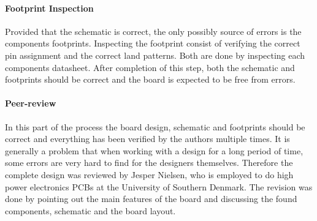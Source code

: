 \paragraph{Footprint Inspection}
Provided that the schematic is correct, the only possibly source of errors is the components footprints. 
Inspecting the footprint consist of verifying the correct pin assignment and the correct land patterns.
Both are done by inspecting each components datasheet. 
After completion of this step, both the schematic and footprints should be correct and the board is expected to be free from errors.

\paragraph{Peer-review}
In this part of the process the board design, schematic and footprints should be correct and everything has been verified by the authors multiple times.
It is generally a problem that when working with a design for a long period of time, some errors are very hard to find for the designers themselves. 
Therefore the complete design was reviewed by Jesper Nielsen, who is employed to do high power electronics PCBs at the University of Southern Denmark. 
The revision was done by pointing out the main features of the board and discussing the found components, schematic and the board layout.

